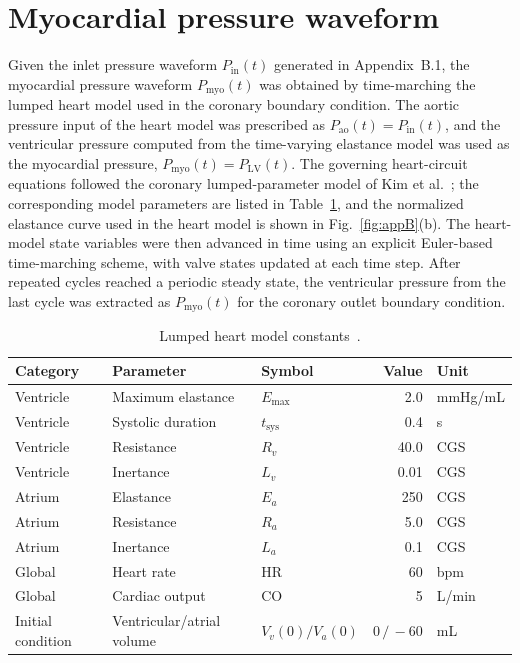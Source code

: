 \documentclass[master,english,final]{kaist-ucs}
\begin{document}
\section{Myocardial pressure waveform}
Given the inlet pressure waveform $P_\mathrm{in}(t)$ generated in Appendix~B.1, the myocardial pressure waveform $P_\mathrm{myo}(t)$ was obtained by time-marching the lumped heart model used in the coronary boundary condition. The aortic pressure input of the heart model was prescribed as $P_\mathrm{ao}(t)=P_\mathrm{in}(t)$, and the ventricular pressure computed from the time-varying elastance model was used as the myocardial pressure, $P_\mathrm{myo}(t)=P_\mathrm{LV}(t)$. The governing heart-circuit equations followed the coronary lumped-parameter model of Kim et al.~\cite{kim2010coronary}; the corresponding model parameters are listed in Table~\ref{tab:appB-heart}, and the normalized elastance curve used in the heart model is shown in Fig.~\ref{fig:appB}(b). The heart-model state variables were then advanced in time using an explicit Euler-based time-marching scheme, with valve states updated at each time step. After repeated cycles reached a periodic steady state, the ventricular pressure from the last cycle was extracted as $P_\mathrm{myo}(t)$ for the coronary outlet boundary condition.

\begin{table}[ht]
\caption[Lumped heart model constants]{Lumped heart model constants~\cite{kim2010coronary}.}
\label{tab:appB-heart}
\begin{center}
\begin{tabular}{lllrl}
\hline\hline
Category & Parameter & Symbol & Value & Unit \\
\hline
Ventricle & Maximum elastance & $E_\mathrm{max}$ & 2.0 & mmHg/mL \\
Ventricle & Systolic duration & $t_\mathrm{sys}$ & 0.4 & s \\
Ventricle & Resistance & $R_v$ & 40.0 & CGS \\
Ventricle & Inertance & $L_v$ & 0.01 & CGS \\
Atrium & Elastance & $E_a$ & 250 & CGS \\
Atrium & Resistance & $R_a$ & 5.0 & CGS \\
Atrium & Inertance & $L_a$ & 0.1 & CGS \\
Global & Heart rate & HR & 60 & bpm \\
Global & Cardiac output & CO & 5 & L/min \\
Initial condition & Ventricular/atrial volume & $V_v(0)/V_a(0)$ & $0\,/\,{-}60$ & mL \\
\hline\hline
\end{tabular}
\end{center}
\end{table}
\end{document}
